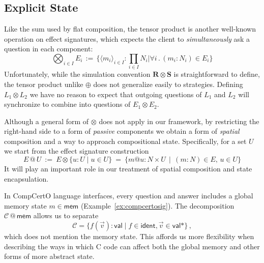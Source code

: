 \documentclass[acmsmall,screen,review,anonymous,nonacm]{acmart}
\newcommand{\kw}[1]{\ensuremath{ \mathsf{#1} }}
\begin{document}

\subsection{Explicit State} %

Like the sum used by flat composition,
the tensor product is another well-known operation on effect signatures,
which expects the client to
\emph{simultaneously} ask a question in each component:
\[
  \bigotimes_{i \in I} E_i \, := \,
    \textstyle
    \big\{ \langle m_i \rangle_{i\in I} : \prod_{i \in I} N_i \mathrel{\big|}
       \forall i \mathbin. (m_i \mathbin: N_i) \in E_i \big\}
\]
Unfortunately,
while the simulation convention $\mathbf{R} \otimes \mathbf{S}$
is straightforward to define,
the tensor product unlike $\oplus$ does not generalize easily to strategies.
Defining
$L_1 \otimes L_2$ %
we have no reason to expect that
outgoing questions of $L_1$ and $L_2$
will synchronize to combine
into questions of $E_1 \otimes E_2$.

Although a general form of $\otimes$
does not apply in our framework,
by restricting the right-hand side
to a form of \emph{passive} components
we obtain a form of \emph{spatial} composition
and a way to approach compositional state.
Specifically,
for a set $U$
we start from the effect signature construction
\[
  E \mathbin@ U \::=\: E \otimes \{ u : U \mid u \in U \} \:=\:
    \{ m @ u : N \times U \,\mid\, (m \mathbin: N) \in E, \, u \in U \}
\]
It will play an important role
in our treatment of spatial composition and state encapsulation.

\begin{example} %
In CompCertO language interfaces,
every question and answer includes a global memory state $m \in \kw{mem}$ (Example~\ref{ex:compcertosig}).
The decomposition $\mathcal{C} \mathbin@ \kw{mem}$ allows us to separate
\[
  \mathcal{C} = \{ f(\vec{v}) \mathbin: \kw{val} \mid
      f \in \kw{ident}, \vec{v} \in \kw{val}* \}
  \,,
\]
which does not mention the memory state.
This affords us more flexibility
when describing the ways in which C code
can affect both the global memory
and other forms of more abstract state.
\end{example}
\end{document}
